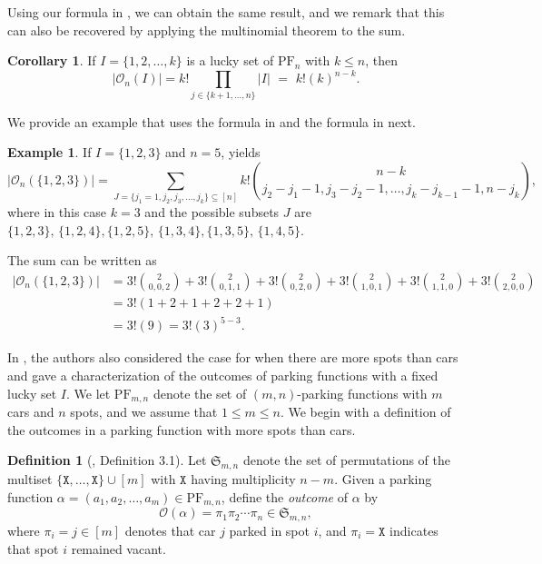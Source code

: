\documentclass[reqno]{amsart}
\newcommand{\X}{\texttt{X}}
\newcommand{\Sym}{\mathfrak{S}}
\newcommand{\PF}{\mathrm{PF}}
\newcommand{\al}[1]{\begin{align*} #1 \end{align*}}
\theoremstyle{definition}
\newtheorem{corollary}{Corollary}[theorem]
\newtheorem{example}[theorem]{Example}
\newtheorem{definition}[theorem]{Definition}
\theoremstyle{remark}
\newcommand{\out}{\mathcal{O}}
\begin{document}
Using our formula in , we can obtain the same result, and we remark that this can also be recovered by applying the multinomial theorem to the sum.

\begin{corollary}\label{cor:formula}
If $I = \{1,2,\ldots, k\}$ is a lucky set of $\PF_n$ with $k\leq n$, then
\[ |\out_n(I)|=k! \prod_{j\in \{k+1,\ldots, n\}} |I| \,\,=\,\, k!(k)^{n-k}.\]
\end{corollary}

We provide an example that uses the formula in  and the formula in \cite{harrismartinez} next. 


 
\begin{example} 
If $I = \{1,2,3\}$ and $n=5$, \cite[Theorem 2.4]{harrismartinez} yields
\[|\out_n(\{1,2,3\})|=\sum_{J=\{j_1=1,j_2,j_3,\ldots,j_k\}\subseteq[n]}k!\binom{n-k}{j_2-j_1-1,j_3-j_2-1,\ldots,j_{k}-j_{k-1}-1,n-j_{k}},\]
where in this case $k=3$ and the possible subsets $J$ are $\{1,2,3\}, \,\{1,2,4\}, \{1,2,5\}, \,\{1,3,4\}, \{1,3,5\}, \,\{1,4,5\}$.
 
The sum can be written as
\al{
|\out_n(\{1,2,3\})|&= 3! \binom{2}{0,0,2} + 3! \binom{2}{0,1,1} + 3! \binom{2}{0,2,0}+ 3! \binom{2}{1,0,1} + 3! \binom{2}{1,1,0} + 3! \binom{2}{2,0,0}\\
&= 3!(1 + 2+ 1 + 2+2+1) \\
&= 3!(9) = 3!(3)^{5-3}.
}
\end{example}





In \cite{harrismartinez}, the authors also considered the case for when there are more spots than cars and gave a characterization of the outcomes of parking functions with a fixed lucky set $I$. We let $\PF_{m,n}$ denote the set of $(m,n)$-parking functions with $m$ cars and $n$ spots, and we assume that $1\leq m \leq n$. We begin with a definition of the outcomes in a parking function with more spots than cars. 

\begin{definition}[\cite{harrismartinez}, Definition 3.1]\label{def:outcome for mn}
Let $\Sym_{m,n}$ denote the set of permutations of the multiset $\{\X,\ldots,\X\}\cup[m]$ with $\X$ having multiplicity $n-m$. Given a parking function $\alpha=(a_1,a_2,\ldots,a_m) \in \PF_{m,n}$, define the \textit{outcome} of $\alpha$ by \[\mathcal{O}(\alpha)=\pi_1\pi_2\cdots\pi_n\in \Sym_{m,n},\] where $\pi_i=j\in[m]$ denotes that car $j$ parked in spot $i$, and $\pi_i=\X$ indicates that spot $i$ remained vacant.
\end{definition}
\end{document}
